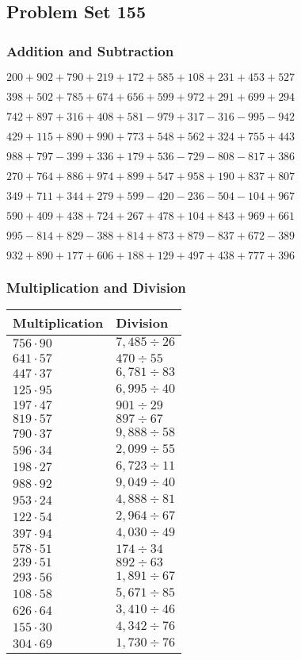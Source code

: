\hypertarget{problem-set-155}{%
\subsection{Problem Set 155}\label{problem-set-155}}

\hypertarget{addition-and-subtraction}{%
\subsubsection{Addition and
Subtraction}\label{addition-and-subtraction}}

\(200 +902 +790 +219 +172 +585 +108 +231 +453 +527\)

\(398 +502 +785 +674 +656 +599 +972 +291 +699 +294\)

\(742 +897 +316 +408 +581 - 979 +317 - 316 - 995 - 942\)

\(429 +115 +890 +990 +773 +548 +562 +324 +755 +443\)

\(988 +797 - 399 +336 +179 +536 - 729 - 808 - 817 +386\)

\(270 +764 +886 +974 +899 +547 +958 +190 +837 +807\)

\(349 +711 +344 +279 +599 - 420 - 236 - 504 - 104 +967\)

\(590 +409 +438 +724 +267 +478 +104 +843 +969 +661\)

\(995 - 814 +829 - 388 +814 +873 +879 - 837 +672 - 389\)

\(932 +890 +177 +606 +188 +129 +497 +438 +777 +396\)

\hypertarget{multiplication-and-division}{%
\subsubsection{Multiplication and
Division}\label{multiplication-and-division}}

\begin{longtable}[]{@{}ll@{}}
\toprule
Multiplication & Division\tabularnewline
\midrule
\endhead
\(756 \cdot 90\) & \(7,485÷26\)\tabularnewline
\(641 \cdot 57\) & \(470÷55\)\tabularnewline
\(447 \cdot 37\) & \(6,781÷83\)\tabularnewline
\(125 \cdot 95\) & \(6,995÷40\)\tabularnewline
\(197 \cdot 47\) & \(901÷29\)\tabularnewline
\(819 \cdot 57\) & \(897÷67\)\tabularnewline
\(790 \cdot 37\) & \(9,888÷58\)\tabularnewline
\(596 \cdot 34\) & \(2,099÷55\)\tabularnewline
\(198 \cdot 27\) & \(6,723÷11\)\tabularnewline
\(988 \cdot 92\) & \(9,049÷40\)\tabularnewline
\(953 \cdot 24\) & \(4,888÷81\)\tabularnewline
\(122 \cdot 54\) & \(2,964÷67\)\tabularnewline
\(397 \cdot 94\) & \(4,030÷49\)\tabularnewline
\(578 \cdot 51\) & \(174 ÷ 34\)\tabularnewline
\(239 \cdot 51\) & \(892÷63\)\tabularnewline
\(293 \cdot 56\) & \(1,891÷67\)\tabularnewline
\(108 \cdot 58\) & \(5,671÷85\)\tabularnewline
\(626 \cdot 64\) & \(3,410÷46\)\tabularnewline
\(155 \cdot 30\) & \(4,342÷76\)\tabularnewline
\(304 \cdot 69\) & \(1,730÷76\)\tabularnewline
\bottomrule
\end{longtable}
